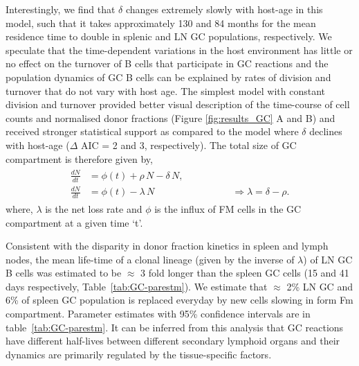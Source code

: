 \documentclass[11pt]{article}
\begin{document}
	Interestingly, we find that $\delta$ changes extremely slowly with host-age in this model, such that it takes approximately 130 and 84 months for the mean residence time to double in splenic and LN GC populations, respectively.
	We speculate that the time-dependent variations in the host environment has little or no effect on the turnover of B cells that participate in GC reactions and the population dynamics of GC B cells can be explained by rates of division and turnover that do not vary with host age.
	The simplest model with constant division and turnover provided better visual description of the time-course of cell counts and normalised donor fractions (Figure \ref{fig:results_GC} A and B) and received stronger statistical support as compared to the model where $\delta$ declines with host-age ($\Delta$ AIC = 2 and 3, respectively).
	The total size of GC compartment is therefore given by,
	\begin{eqnarray}
	\begin{aligned}
	\frac{dN}{dt} & = \phi(t) + \rho \, N - \delta \, N, \\
	\frac{dN}{dt} & = \phi(t) - \lambda \, N  \qquad \qquad \qquad \qquad \Rightarrow \lambda = \delta - \rho.
	\end{aligned}
	\label{eq:GC_total}
	\end{eqnarray}
	where, $\lambda$ is the net loss rate and $\phi$ is the influx of FM cells in the GC compartment at a given time `t'. 
	
	 
	Consistent with the disparity in donor fraction kinetics in spleen and lymph nodes, the mean life-time of a clonal lineage (given by the inverse of $\lambda$) of LN GC B cells was estimated to be $\approx$ 3 fold longer than the spleen GC cells (15 and 41 days respectively, Table~\ref{tab:GC-parestm}).
	We estimate that $\approx$ 2\% LN GC and 6\% of spleen GC population is replaced everyday by new cells slowing in form Fm compartment.
	Parameter estimates with 95\% confidence intervals are in table~\ref{tab:GC-parestm}.
	It can be inferred from this analysis that GC reactions have different half-lives between different secondary lymphoid organs and their dynamics are primarily regulated by the tissue-specific factors.
	
\end{document}
